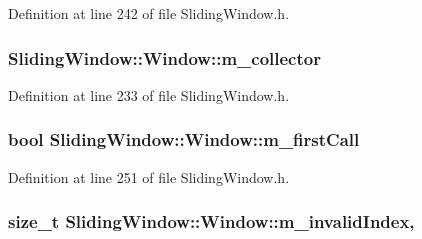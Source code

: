 Definition at line 242 of file Sliding\+Window.\+h.

\subsubsection[{\texorpdfstring{m\+\_\+collector}{m_collector}}]{ Sliding\+Window\+::\+Window\+::m\+\_\+collector\hspace{0.3cm}{\ttfamily [protected]}}\hypertarget{classSlidingWindow_1_1Window_a37032250670011a5a2fdff0a0c406ba3}{}\label{classSlidingWindow_1_1Window_a37032250670011a5a2fdff0a0c406ba3}


Definition at line 233 of file Sliding\+Window.\+h.

\subsubsection[{\texorpdfstring{m\+\_\+first\+Call}{m_firstCall}}]{\setlength{\rightskip}{0pt plus 5cm}bool Sliding\+Window\+::\+Window\+::m\+\_\+first\+Call\hspace{0.3cm}{\ttfamily [protected]}}\hypertarget{classSlidingWindow_1_1Window_af8a01fa818b69a4c3abe07e1f6c738c9}{}\label{classSlidingWindow_1_1Window_af8a01fa818b69a4c3abe07e1f6c738c9}


Definition at line 251 of file Sliding\+Window.\+h.

\subsubsection[{\texorpdfstring{m\+\_\+invalid\+Index}{m_invalidIndex}}]{\setlength{\rightskip}{0pt plus 5cm}size\+\_\+t Sliding\+Window\+::\+Window\+::m\+\_\+invalid\+Index\hspace{0.3cm}{\ttfamily [static]}, {\ttfamily [protected]}}\hypertarget{classSlidingWindow_1_1Window_a9e500dcaf7c2a18fd5a2e8f1775704c2}{}\label{classSlidingWindow_1_1Window_a9e500dcaf7c2a18fd5a2e8f1775704c2}


